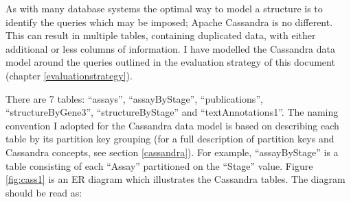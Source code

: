 As with many database systems the optimal way to model a structure is to identify the queries which may be imposed; Apache Cassandra is no different. This can result in multiple tables, containing duplicated data, with either additional or less columns of information. I have modelled the Cassandra data model around the queries outlined in the evaluation strategy of this document (chapter \ref{evaluationstrategy}).

There are 7 tables: ``assays'', ``assayByStage'', ``publications'', ``structureByGene3'', ``structureByStage'' and ``textAnnotations1''. The naming convention I adopted for the Cassandra data model is based on describing each table by its partition key grouping (for a full description of partition keys and Cassandra concepts, see section \ref{cassandra}). For example, ``assayByStage'' is a table consisting of each ``Assay'' partitioned on the ``Stage'' value. Figure \ref{fig:cass1} is an ER diagram which illustrates the Cassandra tables. The diagram should be read as:


